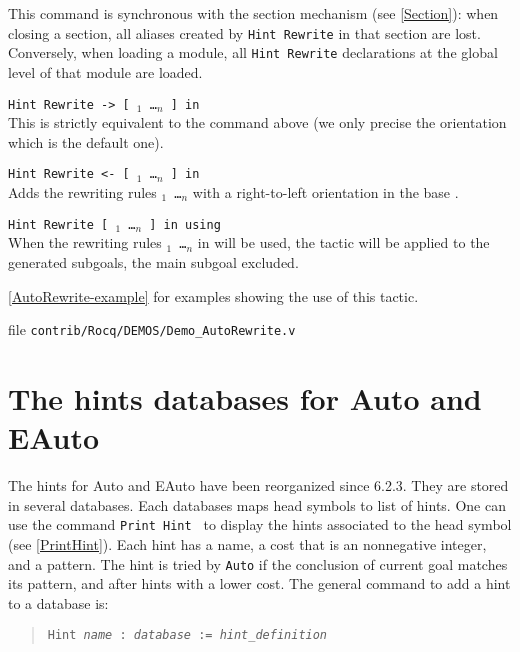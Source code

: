 This command is synchronous with the section mechanism (see \ref{Section}):
when closing a section, all aliases created by \texttt{Hint Rewrite} in that
section are lost. Conversely, when loading a module, all \texttt{Hint Rewrite}
declarations at the global level of that module are loaded.

\begin{Variants}
\item {\tt Hint Rewrite -> [ \term$_1$ \dots \term$_n$ ] in \ident}\\
This is strictly equivalent to the command above (we only precise the
orientation which is the default one).

\item {\tt Hint Rewrite <- [ \term$_1$ \dots \term$_n$ ] in \ident}\\
Adds the rewriting rules {\tt \term$_1$ \dots \term$_n$} with a right-to-left
orientation in the base {\tt \ident}.

\item {\tt Hint Rewrite [ \term$_1$ \dots \term$_n$ ] in {\ident} using \tac}\\
When the rewriting rules {\tt \term$_1$ \dots \term$_n$} in {\tt \ident} will
be used, the tactic {\tt \tac} will be applied to the generated subgoals, the
main subgoal excluded.
\end{Variants}

\SeeAlso \ref{AutoRewrite-example} for examples showing the use of this tactic.

\SeeAlso file \texttt{contrib/Rocq/DEMOS/Demo\_AutoRewrite.v}

\section{The hints databases for Auto and EAuto}
\label{Hints-databases}
The hints for Auto and EAuto have been reorganized since \Coq{}
6.2.3. They are stored in several databases. Each databases maps head
symbols to list of hints. One can use the command \texttt{Print Hint \ident}
to display the hints associated to the head symbol \ident{}
(see \ref{PrintHint}). Each hint has a name,
a cost that is an nonnegative integer, and a pattern. The hint is
tried by \texttt{Auto} if the conclusion of current goal matches its
pattern, and after hints with a lower cost. The general command to add
a hint to a database is:

\begin{quotation}
  \texttt{Hint \textsl{name} : \textsl{database} := \textsl{hint\_definition}}
\end{quotation}

